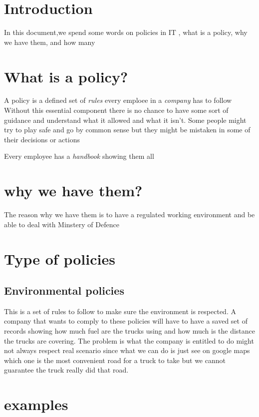 \documentclass[a4paper,12pt]{article}
\begin{document}
\tableofcontents

\section{Introduction}
In this document,we spend some words on policies in IT , what is a policy, why we have them, and how many 

\clearpage

\section{What is a policy?}
A policy is a defined set of \emph{rules} every emploee in a \emph{company} has to follow
Without this essential component there is no chance to have some sort of guidance and understand what it allowed and what it isn't. Some people might try to play safe and go by common sense but they might be mistaken in some of their decisions or actions

Every employee has a \emph{handbook} showing them all

\section{why we have them?}

The reason why we have them is to have a regulated working environment and be able to deal with Minstery of Defence 


\section{Type of policies}
\subsection{Environmental policies}
This is a set of rules to follow to make sure the environment is respected. A company that wants to comply to these policies will have to have a saved set of records showing how much fuel are the trucks using and how much is the distance the trucks are covering. The problem is what the company is entitled to do might not always respect real scenario since what we can do is just see on google maps which one is the most convenient road for a truck to take but we cannot guarantee the truck really did that road.
\clearpage
\printindex

\section{examples}
\end{document}
